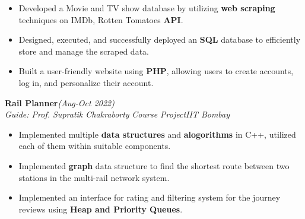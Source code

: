 \documentclass[10pt]{article}
\begin{document}
		\begin{itemize}[itemsep = -0.8 mm, leftmargin=*]
		\vspace{-16pt}
		\item Developed a Movie and TV show database by utilizing \textbf{web scraping} techniques on IMDb, Rotten Tomatoes \textbf{API}.
		\item Designed, executed, and successfully deployed an \textbf{SQL} database to efficiently store and manage the scraped data.
		\item Built a user-friendly website using \textbf{PHP}, allowing users to create accounts, log in, and personalize their account.
	\end{itemize}
{\selectfont
		\textbf{{Rail Planner}}\hfill{\sl \small (Aug-Oct 2022)}\\
	}{\it Guide: Prof. Supratik Chakraborty \textbar} {\it Course Project}\hfill{\sl \small IIT Bombay}\\
	\begin{itemize}[itemsep = -0.8 mm, leftmargin=*]
		\vspace{-16pt}
		\item Implemented multiple \textbf{data structures} and \textbf{alogorithms} in C++, utilized each of them within suitable components.
\item Implemented {\bf graph} data structure to find the shortest route between two stations in the multi-rail network system.
\item Implemented an interface for rating and filtering system for the journey reviews using \textbf{Heap and Priority Queues}.
	\end{itemize}
 \vspace{-16pt}
\end{document}
